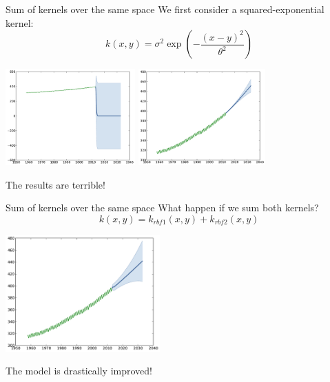 \begin{frame}{Sum of kernels over the same space }
We first consider a squared-exponential kernel:
$$ \displaystyle k(x,y) = \sigma^2\exp \left(-\frac{(x-y)^2}{\theta^2} \right)$$
\begin{center}
\includegraphics[height=3.7cm]{3_gaussian_process_regression/figures/python/CO2-rbfa} \quad \includegraphics[height=3.7cm]{3_gaussian_process_regression/figures/python/CO2-rbfb}
\end{center}
\begin{block}{}
\centering
\alert{The results are terrible!}
\end{block}
\end{frame}

\begin{frame}{Sum of kernels over the same space }
What happen if we sum both kernels?
\begin{equation*}
k(x,y) = k_{rbf1}(x,y) + k_{rbf2}(x,y)
\end{equation*}
\pause
\begin{center}
\vspace{-8mm} \includegraphics[height=4.5cm]{3_gaussian_process_regression/figures/python/CO2-rbfab}
\end{center}
\begin{block}{}
\centering
\alert{The model is drastically improved!}
\end{block}
\end{frame}


